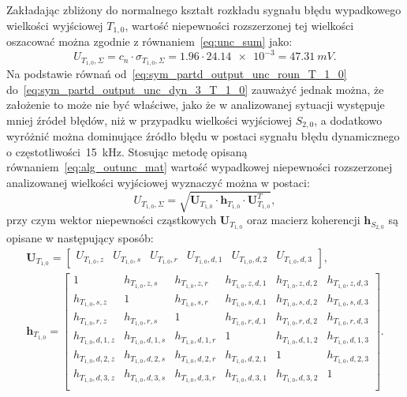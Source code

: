 Zakładając zbliżony do normalnego kształt rozkładu sygnału błędu wypadkowego wielkości wyjściowej $T_{1,0}$, wartość niepewności rozszerzonej tej wielkości oszacować można zgodnie z równaniem~\eqref{eq:unc_sum} jako:
\begin{equation}
U_{T_{1,0},\Sigma} = c_{n} \cdot \sigma_{T_{1,0},\Sigma} = 1.96 \cdot \num{24.14e-3} = \qty{47.31}{mV} \label{eq:sym_partd_output_unc_total_a_T_1_0}.
\end{equation}
Na podstawie równań od~\eqref{eq:sym_partd_output_unc_roun_T_1_0} do~\eqref{eq:sym_partd_output_unc_dyn_3_T_1_0} zauważyć jednak można, że założenie to może nie być właściwe, jako że w analizowanej sytuacji występuje mniej źródeł błędów, niż w przypadku wielkości wyjściowej $S_{2,0}$, a dodatkowo wyróżnić można dominujące źródło błędu w postaci sygnału błędu dynamicznego o częstotliwości~\qty{15}{kHz}.
Stosując metodę opisaną równaniem~\eqref{eq:alg_outunc_mat} wartość wypadkowej niepewności rozszerzonej analizowanej wielkości wyjściowej wyznaczyć można w postaci:
\begin{equation}
U_{T_{1,0},\Sigma} = \sqrt{\mathbf{U}_{T_{1,0}} \cdot \mathbf{h}_{T_{1,0}} \cdot \mathbf{U}_{T_{1,0}}^{T}} \label{eq:sym_partd_output_unc_summul_T_1_0},
\end{equation}
przy czym wektor niepewności cząstkowych $\mathbf{U}_{T_{1,0}}$ oraz macierz koherencji $\mathbf{h}_{S_{2,0}}$ są opisane w następujący sposób:
\begin{gather}
\mathbf{U}_{T_{1,0}} =
\begin{bmatrix}
U_{T_{1,0},z} & U_{T_{1,0},s} & U_{T_{1,0},r} & U_{T_{1,0},d,1} & U_{T_{1,0},d,2} & U_{T_{1,0},d,3}
\end{bmatrix}
\label{eq:sym_partd_output_unc_sumuvect_T_1_0_a}, \\
\mathbf{h}_{T_{1,0}} =
\begin{bmatrix}
1                 & h_{T_{1,0},z,s}   & h_{T_{1,0},z,r}   & h_{T_{1,0},z,d,1} & h_{T_{1,0},z,d,2} & h_{T_{1,0},z,d,3} \\
h_{T_{1,0},s,z}   & 1                 & h_{T_{1,0},s,r}   & h_{T_{1,0},s,d,1} & h_{T_{1,0},s,d,2} & h_{T_{1,0},s,d,3} \\
h_{T_{1,0},r,z}   & h_{T_{1,0},r,s}   & 1                 & h_{T_{1,0},r,d,1} & h_{T_{1,0},r,d,2} & h_{T_{1,0},r,d,3} \\
h_{T_{1,0},d,1,z} & h_{T_{1,0},d,1,s} & h_{T_{1,0},d,1,r} & 1                 & h_{T_{1,0},d,1,2} & h_{T_{1,0},d,1,3} \\
h_{T_{1,0},d,2,z} & h_{T_{1,0},d,2,s} & h_{T_{1,0},d,2,r} & h_{T_{1,0},d,2,1} & 1                 & h_{T_{1,0},d,2,3} \\
h_{T_{1,0},d,3,z} & h_{T_{1,0},d,3,s} & h_{T_{1,0},d,3,r} & h_{T_{1,0},d,3,1} & h_{T_{1,0},d,3,2} & 1                 \\
\end{bmatrix}
\label{eq:sym_partd_output_unc_sumcoher_T_1_0_a}.
\end{gather}
